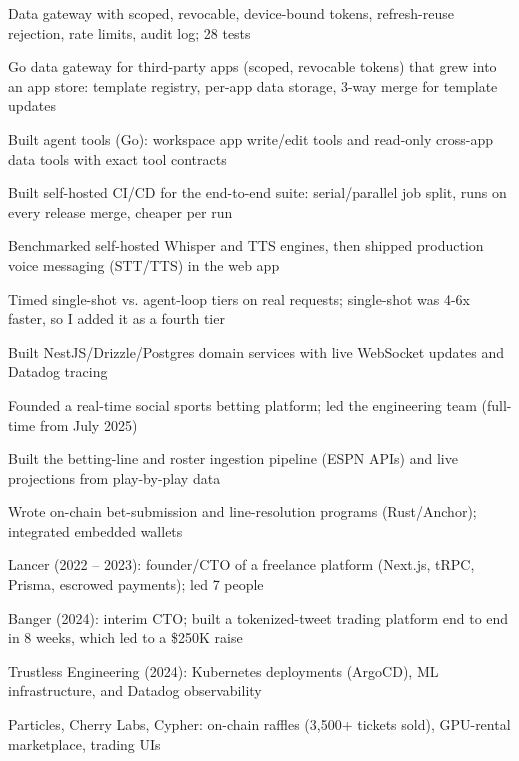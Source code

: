 \documentclass[print]{jack-resume}
\begin{document}
\begin{tightemize}
    \item Data gateway with scoped, revocable, device-bound tokens, refresh-reuse rejection, rate limits, audit log; 28 tests
    \item Go data gateway for third-party apps (scoped, revocable tokens) that grew into an app store: template registry, per-app data storage, 3-way merge for template updates
    \item Built agent tools (Go): workspace app write/edit tools and read-only cross-app data tools with exact tool contracts
    \item Built self-hosted CI/CD for the end-to-end suite: serial/parallel job split, runs on every release merge, cheaper per run
    \item Benchmarked self-hosted Whisper and TTS engines, then shipped production voice messaging (STT/TTS) in the web app
    \item Timed single-shot vs. agent-loop tiers on real requests; single-shot was 4-6x faster, so I added it as a fourth tier
\end{tightemize}
\sectionsep

\begin{tightemize}
    \item Built NestJS/Drizzle/Postgres domain services with live WebSocket updates and Datadog tracing
    \item Founded a real-time social sports betting platform; led the engineering team (full-time from July 2025)
    \item Built the betting-line and roster ingestion pipeline (ESPN APIs) and live projections from play-by-play data
    \item Wrote on-chain bet-submission and line-resolution programs (Rust/Anchor); integrated embedded wallets
\end{tightemize}
\sectionsep

\begin{tightemize}
    \item Lancer (2022 – 2023): founder/CTO of a freelance platform (Next.js, tRPC, Prisma, escrowed payments); led 7 people
    \item Banger (2024): interim CTO; built a tokenized-tweet trading platform end to end in 8 weeks, which led to a \$250K raise
    \item Trustless Engineering (2024): Kubernetes deployments (ArgoCD), ML infrastructure, and Datadog observability
    \item Particles, Cherry Labs, Cypher: on-chain raffles (3,500+ tickets sold), GPU-rental marketplace, trading UIs
\end{tightemize}
\sectionsep
\end{document}
